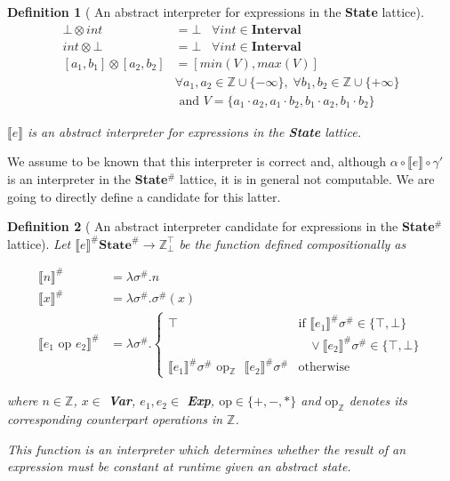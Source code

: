 \documentclass{article}
\newtheorem{definition}{Definition}
\begin{document}
\begin{definition}[
  An abstract interpreter for expressions in the \textbf{State}
  lattice
]
  \begin{align*}
    \bot \otimes int &= \bot \;\;\;
      \forall int \in \textbf{Interval} \\
    int \otimes \bot &= \bot \;\;\;
      \forall int \in \textbf{Interval} \\
    [a_1, b_1] \otimes [a_2, b_2] &= 
      [min(V), max(V)] \\
        &\forall a_1, a_2 \in \mathbb{Z} \cup \{-\infty\}, 
        \; \forall b_1, b_2 \in \mathbb{Z} \cup \{+\infty\} \\
        & \text{ and } V = \{ a_1 \cdot a_2, a_1 \cdot b_2, b_1 \cdot a_2, b_1 \cdot b_2 \}
  \end{align*}

  $\llbracket e \rrbracket$ is an abstract interpreter for 
  expressions in the \textbf{State} lattice.
\end{definition}

We assume to be known that this interpreter is correct and,
although $\alpha \circ \llbracket e \rrbracket \circ \gamma'$
is an interpreter in the \textbf{State$^\#$} lattice, it is in 
general not computable. We are going to directly define a candidate 
for this latter.

\begin{definition}[
  An abstract interpreter candidate for expressions in 
  the \textbf{State$^\#$} lattice
]\label{def:cabs}
  Let $\llbracket e \rrbracket^\# \textbf{State}^\# \rightarrow 
  \mathbb{Z}_\bot^\top$ be the function defined compositionally as
  
  \begin{align*}
    \llbracket n \rrbracket^\# &= 
      \lambda \sigma^\#. n \\ 
    \llbracket x \rrbracket^\# &= 
      \lambda \sigma^\#. \sigma^\#(x) \\ 
    \llbracket e_1 \text{ op } e_2 \rrbracket^\# &= 
      \lambda \sigma^\#.
      \begin{cases}
        \top & \text{if } 
          \llbracket e_1 \rrbracket^\# \sigma^\# 
            \in \{\top, \bot\} \\ 
          &\;\;\;\lor
          \llbracket e_2 \rrbracket^\# \sigma^\# 
            \in \{\top, \bot\} \\
          \llbracket e_1 \rrbracket^\# \sigma^\# 
            \text{ op$_\mathbb{Z}$ } \llbracket e_2 
            \rrbracket^\# \sigma^\# 
            & \text{otherwise} 
      \end{cases}
  \end{align*}

  where $n \in \mathbb{Z}$, $x \in$ \textbf{Var}, $e_1, e_2 \in$ 
  \textbf{Exp}, $\text{op} \in \{+, -, *\}$ and 
  $\text{op}_\mathbb{Z}$ denotes its corresponding counterpart
  operations in $\mathbb{Z}$.

  This function is an interpreter which determines whether the 
  result of an expression must be constant at runtime given an 
  abstract state.
\end{definition}
\end{document}
